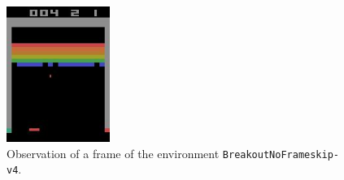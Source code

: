 \begin{figure}
    \centering
    \includegraphics[width=0.3\textwidth]{images/gym-breakout-image-example.jpg}
    \caption{Observation of a frame of the environment
        \texttt{BreakoutNoFrameskip-v4}.}
    \label{fig:gym-breakout-image-example}
\end{figure}
